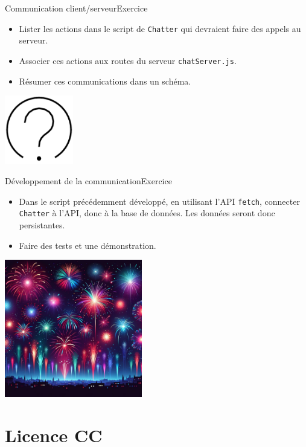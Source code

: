 \documentclass{beamer}
\begin{document}
    \begin{frame}{Communication client/serveur}{Exercice \execcounterdispinc{}}
        \begin{itemize}
            \item Lister les actions dans le script de \lstinline{Chatter} qui devraient faire des appels au serveur.
            \item Associer ces actions aux routes du serveur \lstinline{chatServer.js}.
            \item Résumer ces communications dans un schéma.
        \end{itemize}
        \bigbreak
        \centering
        \includegraphics[width=3cm]{image/question-mark}
    \end{frame}


    \begin{frame}{Développement de la communication}{Exercice \execcounterdispinc{}}
        \begin{itemize}
            \item Dans le script précédemment développé, en utilisant l'API \lstinline{fetch}, connecter \lstinline{Chatter} à l'API, donc à la base de données.
            Les données seront donc persistantes.
            \item Faire des tests et une démonstration.
        \end{itemize}
        \bigbreak
        \centering
        \includegraphics[width=6cm]{image/fireworks}
    \end{frame}


    \section{Licence CC}\label{sec:licence}
\end{document}
